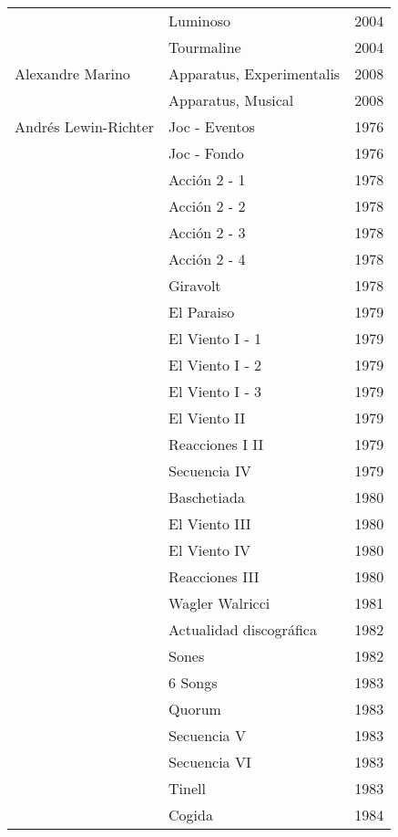 \begin{center}
\begin{longtable}{ p{}  p{}  p{} }
& Luminoso & 2004 \\ \cmidrule (r){2-3}   
& Tourmaline & 2004 \\ \midrule 
Alexandre Marino & Apparatus, Experimentalis & 2008 \\ \cmidrule (r){2-3}
& Apparatus, Musical & 2008 \\ \midrule 
Andrés Lewin-Richter & Joc - Eventos & 1976 \\ \cmidrule (r){2-3} 
& Joc - Fondo & 1976 \\ \cmidrule (r){2-3} 
& Acción 2 - 1 & 1978 \\ \cmidrule (r){2-3} 
& Acción 2 - 2 & 1978 \\ \cmidrule (r){2-3} 
& Acción 2 - 3 & 1978 \\ \cmidrule (r){2-3} 
& Acción 2 - 4 & 1978 \\ \cmidrule (r){2-3} 
& Giravolt & 1978 \\ \cmidrule (r){2-3} 
& El Paraiso & 1979 \\ \cmidrule (r){2-3} 
& El Viento I - 1 & 1979 \\ \cmidrule (r){2-3} 
& El Viento I - 2 & 1979 \\ \cmidrule (r){2-3} 
& El Viento I - 3 & 1979 \\ \cmidrule (r){2-3} 
& El Viento II & 1979 \\ \cmidrule (r){2-3} 
& Reacciones I II & 1979 \\ \cmidrule (r){2-3} 
& Secuencia IV & 1979 \\ \cmidrule (r){2-3} 
& Baschetiada & 1980 \\ \cmidrule (r){2-3} 
& El Viento III & 1980 \\ \cmidrule (r){2-3} 
& El Viento IV & 1980 \\ \cmidrule (r){2-3} 
& Reacciones III & 1980 \\ \cmidrule (r){2-3} 
& Wagler Walricci & 1981 \\ \cmidrule (r){2-3} 
& Actualidad discográfica & 1982 \\ \cmidrule (r){2-3} 
& Sones & 1982 \\ \cmidrule (r){2-3} 
& 6 Songs & 1983 \\ \cmidrule (r){2-3} 
& Quorum & 1983 \\ \cmidrule (r){2-3} 
& Secuencia V & 1983 \\ \cmidrule (r){2-3} 
& Secuencia VI & 1983 \\ \cmidrule (r){2-3} 
& Tinell & 1983 \\ \cmidrule (r){2-3} 
& Cogida & 1984 \\ \cmidrule (r){2-3} 

\end{longtable}
\end{center}
